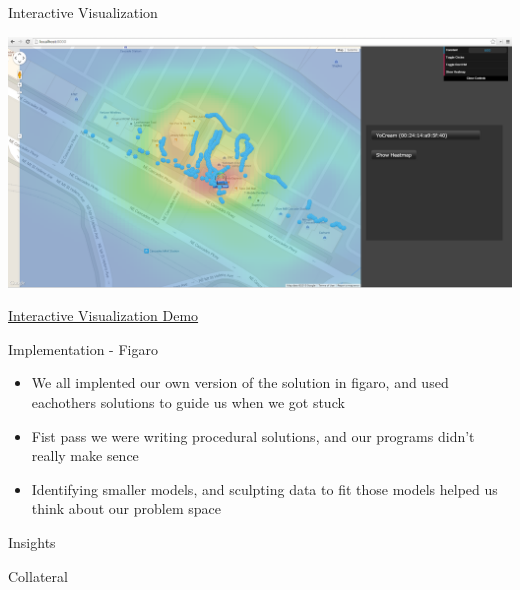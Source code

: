 \documentclass[11pt]{beamer}
\begin{document}
\begin{frame}{Interactive Visualization}

\includegraphics[height=0.55\textheight]{pictures/screenshot4.png}

\href{http://localhost:8000/}{Interactive Visualization Demo}

\end{frame}

\begin{frame}{Implementation - Figaro}
\begin{multicols}{2}
\resizebox{!}{1.5in}{
}
\columnbreak

\begin{itemize}
\item We all implented our own version of the solution in figaro, and used eachothers solutions to guide us when we got stuck
\item Fist pass we were writing procedural solutions, and our programs didn't really make sence
\item Identifying smaller models, and sculpting data to fit those models helped us think about our problem space
\end{itemize}
\end{multicols}

\end{frame}

\begin{frame}{Insights}

\end{frame}

\begin{frame}{Collateral}


\end{frame}
\end{document}
